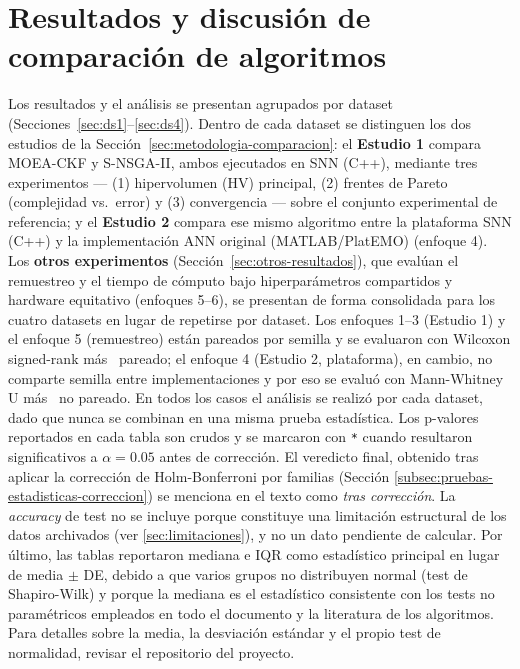 \section{Resultados y discusión de comparación de algoritmos}
\label{sec:resultados-discusion}

Los resultados y el análisis se presentan agrupados por dataset (Secciones~\ref{sec:ds1}--\ref{sec:ds4}). Dentro de cada dataset se distinguen los dos estudios de la Sección~\ref{sec:metodologia-comparacion}: el \textbf{Estudio 1} compara MOEA-CKF y S-NSGA-II, ambos ejecutados en SNN (C++), mediante tres experimentos --- (1) hipervolumen (HV) principal, (2) frentes de Pareto (complejidad vs.\ error) y (3) convergencia --- sobre el conjunto experimental de referencia; y el \textbf{Estudio 2} compara ese mismo algoritmo entre la plataforma SNN (C++) y la implementación ANN original (MATLAB/PlatEMO) (enfoque 4). Los \textbf{otros experimentos} (Sección~\ref{sec:otros-resultados}), que evalúan el remuestreo y el tiempo de cómputo bajo hiperparámetros compartidos y hardware equitativo (enfoques 5--6), se presentan de forma consolidada para los cuatro datasets en lugar de repetirse por dataset. Los enfoques 1--3 (Estudio 1) y el enfoque 5 (remuestreo) están pareados por semilla y se evaluaron con Wilcoxon signed-rank más \Atwelve\ pareado; el enfoque 4 (Estudio 2, plataforma), en cambio, no comparte semilla entre implementaciones y por eso se evaluó con Mann-Whitney U más \Atwelve\ no pareado. En todos los casos el análisis se realizó por cada dataset, dado que nunca se combinan en una misma prueba estadística. Los p-valores reportados en cada tabla son crudos y se marcaron con \texttt{*} cuando resultaron significativos a $\alpha=0.05$ antes de corrección. El veredicto final, obtenido tras aplicar la corrección de Holm-Bonferroni por familias (Sección \ref{subsec:pruebas-estadisticas-correccion}) se menciona en el texto como \textit{tras corrección}. La \textit{accuracy} de test no se incluye porque constituye una limitación estructural de los datos archivados (ver \ref{sec:limitaciones}), y no un dato pendiente de calcular. Por último, las tablas reportaron mediana e IQR como estadístico principal en lugar de media $\pm$ DE, debido a que varios grupos no distribuyen normal (test de Shapiro-Wilk) y porque la mediana es el estadístico consistente con los tests no paramétricos empleados en todo el documento y la literatura de los algoritmos. Para detalles sobre la media, la desviación estándar y el propio test de normalidad, revisar el repositorio del proyecto.

